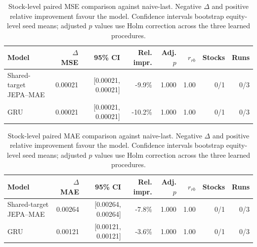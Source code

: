 \begin{table}[t]
\centering
\small
\caption{Stock-level paired MSE comparison against naive-last. Negative $\Delta$ and positive relative improvement favour the model. Confidence intervals bootstrap equity-level seed means; adjusted $p$ values use Holm correction across the three learned procedures.}
\label{tab:paired_mse_naive}
\begin{tabular}{lrrrrrrr}
\toprule
Model & $\Delta$MSE & 95\% CI & Rel. impr. & Adj. $p$ & $r_{rb}$ & Stocks & Runs \\
\midrule
Shared-target JEPA--MAE & 0.00021 & [0.00021, 0.00021] & -9.9\% & 1.000 & 1.00 & 0/1 & 0/3 \\
GRU & 0.00021 & [0.00021, 0.00021] & -10.2\% & 1.000 & 1.00 & 0/1 & 0/3 \\
\bottomrule
\end{tabular}
\end{table}

\begin{table}[t]
\centering
\small
\caption{Stock-level paired MAE comparison against naive-last. Negative $\Delta$ and positive relative improvement favour the model. Confidence intervals bootstrap equity-level seed means; adjusted $p$ values use Holm correction across the three learned procedures.}
\label{tab:paired_mae_naive}
\begin{tabular}{lrrrrrrr}
\toprule
Model & $\Delta$MAE & 95\% CI & Rel. impr. & Adj. $p$ & $r_{rb}$ & Stocks & Runs \\
\midrule
Shared-target JEPA--MAE & 0.00264 & [0.00264, 0.00264] & -7.8\% & 1.000 & 1.00 & 0/1 & 0/3 \\
GRU & 0.00121 & [0.00121, 0.00121] & -3.6\% & 1.000 & 1.00 & 0/1 & 0/3 \\
\bottomrule
\end{tabular}
\end{table}

